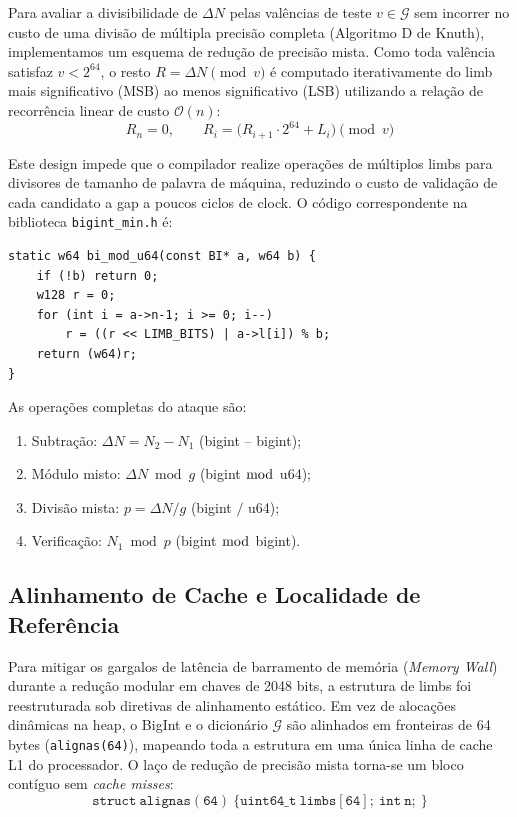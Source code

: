 \documentclass[12pt,a4paper]{article}
\theoremstyle{plain}
\begin{document}
Para avaliar a divisibilidade de $\Delta N$ pelas valências de teste
$v \in \mathcal{G}$ sem incorrer no custo de uma divisão de múltipla
precisão completa (Algoritmo D de Knuth), implementamos um esquema de
redução de precisão mista.  Como toda valência satisfaz $v < 2^{64}$,
o resto $R = \Delta N \pmod v$ é computado iterativamente do limb mais
significativo (MSB) ao menos significativo (LSB) utilizando a relação
de recorrência linear de custo $\mathcal{O}(n)$:
\[
R_n = 0,\qquad
R_i = \bigl( R_{i+1} \cdot 2^{64} + L_i \bigr) \pmod v
\]

Este design impede que o compilador realize operações de múltiplos
limbs para divisores de tamanho de palavra de máquina, reduzindo o
custo de validação de cada candidato a gap a poucos ciclos de clock.
O código correspondente na biblioteca \texttt{bigint\_min.h} é:
\begin{verbatim}
static w64 bi_mod_u64(const BI* a, w64 b) {
    if (!b) return 0;
    w128 r = 0;
    for (int i = a->n-1; i >= 0; i--)
        r = ((r << LIMB_BITS) | a->l[i]) % b;
    return (w64)r;
}
\end{verbatim}

As operações completas do ataque são:
\begin{enumerate}
  \item Subtração: $\Delta N = N_2 - N_1$ (bigint -- bigint);
  \item Módulo misto: $\Delta N \bmod g$ (bigint $\bmod$ u64);
  \item Divisão mista: $p = \Delta N / g$ (bigint $/$ u64);
  \item Verificação: $N_1 \bmod p$ (bigint $\bmod$ bigint).
\end{enumerate}

\subsection{Alinhamento de Cache e Localidade de Referência}

Para mitigar os gargalos de latência de barramento de memória
(\textit{Memory Wall}) durante a redução modular em chaves de 2048 bits,
a estrutura de limbs foi reestruturada sob diretivas de alinhamento
estático.  Em vez de alocações dinâmicas na heap, o BigInt e o
dicionário $\mathcal{G}$ são alinhados em fronteiras de 64 bytes
(\texttt{alignas(64)}), mapeando toda a estrutura em uma única linha
de cache L1 do processador.  O laço de redução de precisão mista
torna-se um bloco contíguo sem \textit{cache misses}:
\[
\mathtt{struct\ alignas(64)\ \{ uint64\_t\ limbs[64];\ int\ n;\ \}}
\]
\end{document}
